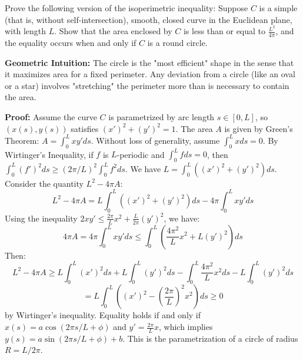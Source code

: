 \clearpage

\begin{exercise}
\label{geometry:2012:4}
Prove the following version of the isoperimetric inequality: Suppose $C$ is a simple (that is, without self-intersection), smooth, closed curve in the Euclidean plane, with length $L$. Show that the area enclosed by $C$ is less than or equal to $\frac{L^{2}}{4\pi}$, and the equality occurs when and only if $C$ is a round circle.
\end{exercise}

\begin{solution}
\textbf{Geometric Intuition:} The circle is the "most efficient" shape in the sense that it maximizes area for a fixed perimeter. Any deviation from a circle (like an oval or a star) involves "stretching" the perimeter more than is necessary to contain the area.

\textbf{Proof:} Assume the curve $C$ is parametrized by arc length $s \in [0, L]$, so $(x(s), y(s))$ satisfies $(x')^2 + (y')^2 = 1$. The area $A$ is given by Green's Theorem: $A = \int_0^L x y' ds$. Without loss of generality, assume $\int_0^L x ds = 0$.
By Wirtinger's Inequality, if $f$ is $L$-periodic and $\int_0^L f ds = 0$, then $\int_0^L (f')^2 ds \geq (2\pi/L)^2 \int_0^L f^2 ds$.
We have $L = \int_0^L ((x')^2 + (y')^2) ds$.
Consider the quantity $L^2 - 4\pi A$:
\[ L^2 - 4\pi A = L \int_0^L ((x')^2 + (y')^2) ds - 4\pi \int_0^L x y' ds \]
Using the inequality $2xy' \leq \frac{2\pi}{L} x^2 + \frac{L}{2\pi} (y')^2$, we have:
\[ 4\pi A = 4\pi \int_0^L x y' ds \leq \int_0^L \left( \frac{4\pi^2}{L} x^2 + L (y')^2 \right) ds \]
Then:
\[ L^2 - 4\pi A \geq L \int_0^L (x')^2 ds + L \int_0^L (y')^2 ds - \int_0^L \frac{4\pi^2}{L} x^2 ds - L \int_0^L (y')^2 ds \]
\[ = L \int_0^L \left( (x')^2 - \left(\frac{2\pi}{L}\right)^2 x^2 \right) ds \geq 0 \]
by Wirtinger's inequality. Equality holds if and only if $x(s) = a \cos(2\pi s/L + \phi)$ and $y' = \frac{2\pi}{L} x$, which implies $y(s) = a \sin(2\pi s/L + \phi) + b$. This is the parametrization of a circle of radius $R = L/2\pi$.
\end{solution}

